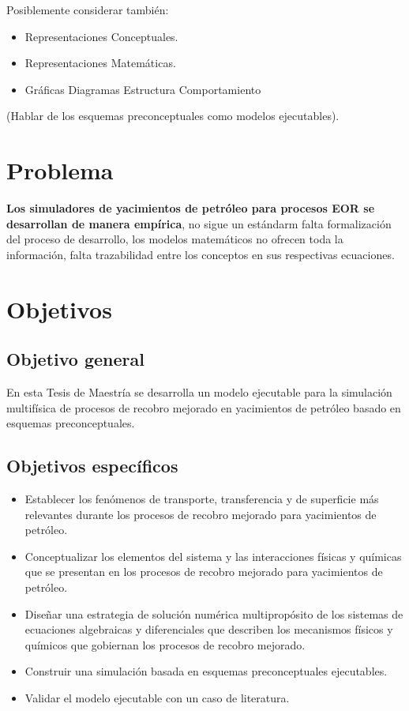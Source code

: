Posiblemente considerar también:
\begin{itemize}
	\item Representaciones Conceptuales.
	\item Representaciones Matemáticas.
	\item Gráficas
	\subitem Diagramas
	\subsubitem Estructura
	\subsubitem Comportamiento
\end{itemize}

(Hablar de los esquemas preconceptuales como modelos ejecutables).

\section{Problema}
\textbf{Los simuladores de yacimientos de petróleo para procesos EOR se desarrollan de manera empírica}, no sigue un estándarm falta formalización del proceso de desarrollo, los modelos matemáticos no ofrecen toda la información, falta trazabilidad entre los conceptos en sus respectivas ecuaciones. 
\section{Objetivos}
\subsection{Objetivo general}
En esta Tesis de Maestría se desarrolla un modelo ejecutable para la simulación multifísica de procesos de recobro mejorado en yacimientos de petróleo basado en esquemas preconceptuales.
\subsection{Objetivos específicos}
\begin{itemize}
	\item Establecer los fenómenos de transporte, transferencia y de superficie más relevantes durante los procesos de recobro mejorado para yacimientos de petróleo.
	\item Conceptualizar los elementos del sistema y las interacciones físicas y químicas que se presentan en los procesos de recobro mejorado para yacimientos de petróleo.
	\item Diseñar una estrategia de solución numérica multipropósito de los sistemas de ecuaciones algebraicas y diferenciales que describen los mecanismos físicos y químicos que gobiernan los procesos de recobro mejorado.
	\item Construir una simulación basada en esquemas preconceptuales ejecutables.
	\item Validar el modelo ejecutable con un caso de literatura.
\end{itemize}